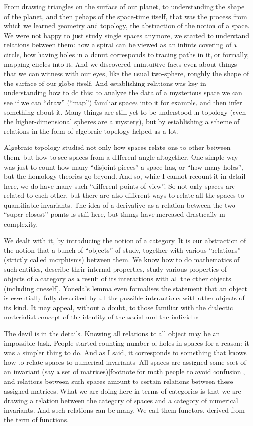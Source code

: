 \documentclass{article}
\begin{document}
From drawing triangles on the surface of our planet, to understanding the shape of the planet, and then pehaps of the space-time itself, that was the process from which we learned geometry and topology, the abstraction of the notion of a space. We were not happy to just study single spaces anymore, we started to understand relations between them: how a spiral can be viewed as an infinte covering of a circle, how having holes in a donut corresponds to tracing paths in it, or formally, mapping circles into it. And we discovered unintuitive facts even about things that we can witness with our eyes, like the usual two-sphere, roughly the shape of the surface of our globe itself. And establishing relations was key in understanding how to do this: to analyze the data of a mysterious space we can see if we can “draw” (“map”) familiar spaces into it for example, and then infer something about it. Many things are still yet to be understood in topology (even the higher-dimensional spheres are a mystery), but by establishing a scheme of relations in the form of algebraic topology helped us a lot.

Algebraic topology studied not only how spaces relate one to other between them, but how to see spaces from a different angle altogether. One simple way was just to count how many “disjoint pieces” a space has, or “how many holes”, but the homology theories go beyond. And so, while I cannot recount it in detail here, we do have many such “different points of view”. So not only spaces are related to each other, but there are also different ways to relate all the spaces to quantifiable invariants. The idea of a derivative as a relation between the two “super-closest” points is still here, but things have increased drastically in complexity.

We dealt with it, by introducing the notion of a category. It is our abstraction of the notion that a bunch of “objects” of study, together with various “relations” (strictly called morphisms) between them. We know how to do mathematics of such entities, describe their internal properties, study various properties of objects of a category as a result of its interactions with all the other objects (including oneself). Yoneda’s lemma even formalises the statement that an object is essentially fully described by all the possible interactions with other objects of its kind. It may appeal, without a doubt, to those familiar with the dialectic materialist concept of the identity of the social and the individual.

The devil is in the details. Knowing all relations to all object may be an impossible task. People started counting number of holes in spaces for a reason: it was a simpler thing to do. And as I said, it corresponds to something that knows how to relate spaces to numerical invariants. All spaces are assigned some sort of an invariant (say a set of matrices)[footnote for math people to avoid confusion], and relations between such spaces amount to certain relations between these assigned matrices. What we are doing here in terms of categories is that we are drawing a relation between the category of spaces and a category of numerical invariants. And such relations can be many. We call them functors, derived from the term of functions.
\end{document}
